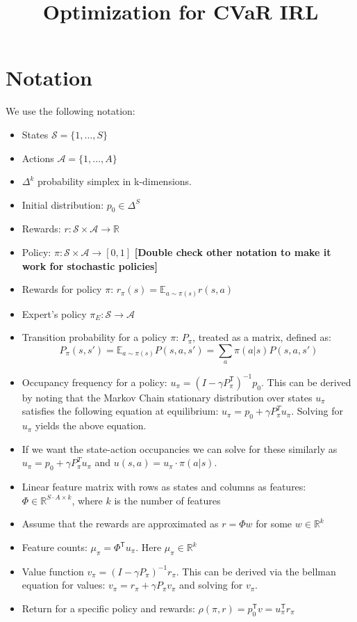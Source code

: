 \documentclass{article}
\title{Optimization for CVaR IRL}
\author{}
\newcommand{\tr}{^\mathsf{T}}
\newcommand{\states}{\mathcal{S}}
\newcommand{\actions}{\mathcal{A}}
\newcommand{\Real}{\mathbb{R}}
\begin{document}
	\maketitle
	
	
\section{Notation}	
	We use the following notation:
	\begin{itemize}
		\item States $\states = \{1, \ldots, S \}$
		\item Actions $\actions = \{ 1, \ldots, A\}$
		\item $\Delta^k$ probability simplex in k-dimensions.
		\item Initial distribution: $p_0 \in \Delta^S$
		\item Rewards: $r: \states\times\actions \to \Real$
		\item Policy: $\pi: \states \times \actions \to [0,1]$  \textbf{[Double check other notation to make it work for stochastic policies]}
		\item Rewards for policy $\pi$: $r_\pi(s) = \mathbb{E}_{a \sim \pi(s)} r(s, a)$
		\item Expert's policy $\pi_{E}: \states \to \actions$
		\item Transition probability for a policy $\pi$: $P_\pi$, treated as a matrix, defined as:
		\[ P_\pi(s,s') = \mathbb{E}_{a \sim \pi(s)} P(s,a,s') = \sum_a \pi(a|s) P(s,a,s'	)\]
		\item Occupancy frequency for a policy: $u_\pi = (I - \gamma P_\pi \tr)^{-1} p_0$. This can be derived by noting that the Markov Chain stationary distribution over states $u_\pi$ satisfies the following equation at equilibrium: $u_\pi = p_0 + \gamma P^T_\pi u_\pi$. Solving for $u_\pi$ yields the above equation. 
		\item If we want the state-action occupancies we can solve for these similarly as $u_\pi = p_0 + \gamma P^T_\pi u_\pi$ and $u(s,a) = u_\pi \cdot \pi(a|s)$.
		\item Linear feature matrix with rows as states and columns as features: $\Phi \in \Real^{S\cdot A \times k}$, where $k$ is the number of features
		\item Assume that the rewards are approximated as $r = \Phi w$ for some $w\in\Real^k$
		\item Feature counts: $\mu_\pi = \Phi\tr u_\pi$. Here $\mu_\pi \in \Real^k$
		\item Value function $v_\pi = (I - \gamma P_\pi)^{-1} r_\pi $. This can be derived via the bellman equation for values: $v_\pi = r_\pi + \gamma P_\pi v_\pi$ and solving for $v_\pi$.
		\item Return for a specific policy and rewards: $\rho(\pi, r) = p_0\tr v = u_\pi\tr r_\pi$
	\end{itemize}
	
\end{document}
